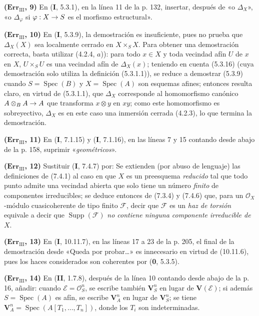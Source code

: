 \documentclass[10pt,oneside,openany]{book}
\theoremstyle{egaenv}\newtheorem*{env}{---}
\theoremstyle{egastatement}
\theoremstyle{egadescription}
\renewcommand{\to}{\mathchoice{\longrightarrow}{\rightarrow}{\rightarrow}{\rightarrow}}
\begin{document}
\noindent\textbf{($\mathbf{Err}_{\mathrm{III}}$, 9)} En (\textbf I, 5.3.1), en la
línea 11 de la p. 132, insertar, después de «o $\Delta_X$», «o $\Delta_\varphi$
si $\varphi:X\to S$ es el morfismo estructural».

\noindent\textbf{($\mathbf{Err}_{\mathrm{III}}$, 10)} En (\textbf I, 5.3.9), la
demostración es insuficiente, pues no prueba que $\Delta_X(X)$ sea localmente
cerrado en $X\times_SX$. Para obtener una demostración correcta, basta utilizar
(4.2.4, $a$)): para todo $x\in X$ y toda vecindad afín $U$ de $x$ en $X$,
$U\times_SU$ es una vecindad afín de $\Delta_X(x)$; teniendo en cuenta (5.3.16)
(cuya demostración solo utiliza la definición (5.3.1.1)), se reduce a demostrar
(5.3.9) cuando $S=\operatorname{Spec}(B)$ y $X=\operatorname{Spec}(A)$ son
esquemas afines; entonces resulta claro, en virtud de (5.3.1.1), que $\Delta_X$
corresponde al homomorfismo canónico $A\otimes_BA\to A$ que transforma
$x\otimes y$ en $xy$; como este homomorfismo es sobreyectivo, $\Delta_X$ es en
este caso una inmersión cerrada (4.2.3), lo que termina la demostración.

\noindent\textbf{($\mathbf{Err}_{\mathrm{III}}$, 11)} En (\textbf I, 7.1.15) y
(\textbf I, 7.1.16), en las líneas 7 y 15 contando desde abajo de la p. 158, suprimir
«\emph{geométricos}».

\noindent\textbf{($\mathbf{Err}_{\mathrm{III}}$, 12)} Sustituir (\textbf I, 7.4.7)
por: Se extienden (por abuso de lenguaje) las definiciones de (7.4.1) al caso
en que $X$ es un preesquema \emph{reducido} tal que todo punto admite una
vecindad abierta que solo tiene un número \emph{finito} de componentes
irreducibles; se deduce entonces de (7.3.4) y (7.4.6) que, para un
$\mathscr O_X$-módulo cuasicoherente de tipo finito $\mathscr F$, decir que
$\mathscr F$ es un \emph{haz de torsión} equivale a decir que
$\operatorname{Supp}(\mathscr F)$ \emph{no contiene ninguna componente
irreducible de $X$}.

\noindent\textbf{($\mathbf{Err}_{\mathrm{III}}$, 13)} En (\textbf I, 10.11.7), en
las líneas 17 a 23 de la p. 205, el final de la demostración desde «Queda por
probar\ldots{}» es innecesario en virtud de (10.11.6), pues los haces
considerados son coherentes por (\textbf{0}, 5.3.5).

\noindent\textbf{($\mathbf{Err}_{\mathrm{III}}$, 14)} En (\textbf{II}, 1.7.8),
después de la línea 10 contando desde abajo de la p. 16, añadir: cuando
$\mathscr E=\mathscr O_S^n$, se escribe también $\mathbf V_S^n$ en lugar de
$\mathbf V(\mathscr E)$; si además $S=\operatorname{Spec}(A)$ es afín, se
escribe $\mathbf V_A^n$ en lugar de $\mathbf V_S^n$; se tiene
$\mathbf V_A^n=\operatorname{Spec}(A[T_1,\ldots,T_n])$, donde los $T_i$ son
indeterminadas.
\end{document}
